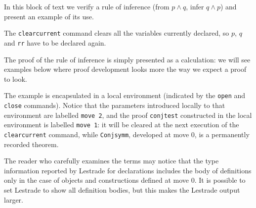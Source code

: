 \documentclass[12pt]{article}
\begin{document}
In this block of text we verify a rule of inference (from $p \wedge q$, infer $q \wedge p$) and present an example of its use.

The {\tt clearcurrent} command clears all the variables currently declared, so $p$, $q$ and {\tt rr} have to be declared again.

The proof of the rule of inference is simply presented as a calculation:  we will see examples below where proof development looks more the way we expect a proof to look.

The example is encapsulated in a local environment (indicated by the {\tt open} and {\tt close} commands).  Notice that the parameters introduced locally to that environment
are labelled {\tt move 2}, and the proof {\tt conjtest} constructed in the local environment is labelled {\tt move 1}:  it will be cleared at the next execution of the {\tt clearcurrent}
command, while {\tt Conjsymm}, developed at move 0, is a permanently recorded theorem.

The reader who carefully examines the terms may notice that the type information reported by Lestrade for declarations includes the body of definitions only in the case of
objects and constructions defined at move 0.  It is possible to set Lestrade to show all definition bodies, but this makes the Lestrade output larger.
\end{document}
